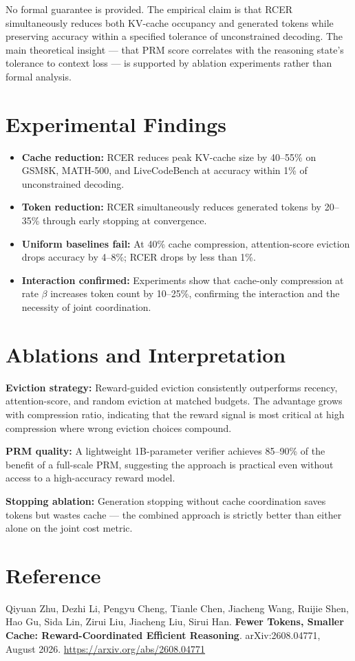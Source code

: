 \documentclass[10pt,twocolumn]{article}
\begin{document}
No formal guarantee is provided. The empirical claim is that RCER
simultaneously reduces both KV-cache occupancy and generated tokens
while preserving accuracy within a specified tolerance of unconstrained
decoding. The main theoretical insight — that PRM score correlates with
the reasoning state's tolerance to context loss — is supported by
ablation experiments rather than formal analysis.

\section{Experimental Findings}

\begin{itemize}[itemsep=2pt,parsep=0pt]
  \item \textbf{Cache reduction:} RCER reduces peak KV-cache size by
    40--55\% on GSM8K, MATH-500, and LiveCodeBench at accuracy
    within 1\% of unconstrained decoding.
  \item \textbf{Token reduction:} RCER simultaneously reduces generated
    tokens by 20--35\% through early stopping at convergence.
  \item \textbf{Uniform baselines fail:} At 40\% cache compression,
    attention-score eviction drops accuracy by 4--8\%; RCER drops by less
    than 1\%.
  \item \textbf{Interaction confirmed:} Experiments show that cache-only
    compression at rate $\beta$ increases token count by 10--25\%,
    confirming the interaction and the necessity of joint coordination.
\end{itemize}

\section{Ablations and Interpretation}

\textbf{Eviction strategy:} Reward-guided eviction consistently outperforms
recency, attention-score, and random eviction at matched budgets.
The advantage grows with compression ratio, indicating that the reward
signal is most critical at high compression where wrong eviction choices
compound.

\textbf{PRM quality:} A lightweight 1B-parameter verifier achieves 85--90\%
of the benefit of a full-scale PRM, suggesting the approach is practical
even without access to a high-accuracy reward model.

\textbf{Stopping ablation:} Generation stopping without cache coordination
saves tokens but wastes cache — the combined approach is strictly better
than either alone on the joint cost metric.

\section*{Reference}

Qiyuan Zhu, Dezhi Li, Pengyu Cheng, Tianle Chen, Jiacheng Wang, Ruijie Shen,
Hao Gu, Sida Lin, Zirui Liu, Jiacheng Liu, Sirui Han.
\textbf{Fewer Tokens, Smaller Cache: Reward-Coordinated Efficient Reasoning}.
arXiv:2608.04771, August 2026.
\url{https://arxiv.org/abs/2608.04771}
\end{document}

